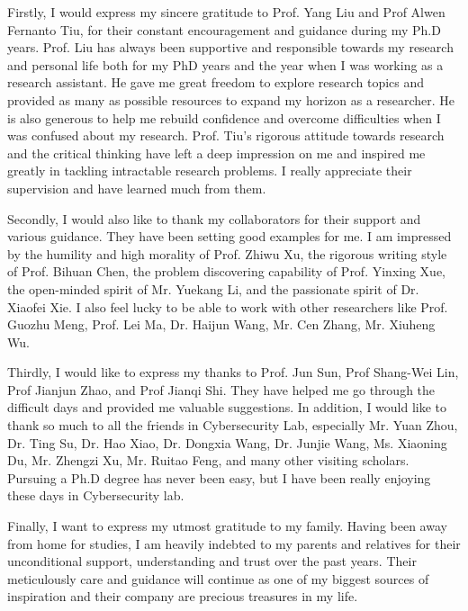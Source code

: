 Firstly, I would express my sincere gratitude to Prof. Yang Liu and Prof Alwen Fernanto Tiu, for their constant encouragement and guidance during my Ph.D years. Prof. Liu has always been supportive and responsible towards my research and personal life both for my PhD years and the year when I was working as a research assistant. He gave me great freedom to explore research topics and provided as many as possible resources to expand my horizon as a researcher. He is also generous to help me rebuild confidence and overcome difficulties when I was confused about my research. Prof. Tiu's rigorous attitude towards research and the critical thinking have left a deep impression on me and inspired me greatly in tackling intractable research problems. I really appreciate their supervision and have learned much from them.

Secondly, I would also like to thank my collaborators for their support and various guidance. They have been setting good examples for me. I am impressed by the humility and high morality of Prof. Zhiwu Xu, the rigorous writing style of Prof. Bihuan Chen, the problem discovering capability of Prof. Yinxing Xue, the open-minded spirit of Mr. Yuekang Li, and the passionate spirit of Dr. Xiaofei Xie. I also feel lucky to be able to work with other researchers like Prof. Guozhu Meng, Prof. Lei Ma, Dr. Haijun Wang, Mr. Cen Zhang, Mr. Xiuheng Wu.

Thirdly, I would like to express my thanks to Prof. Jun Sun, Prof Shang-Wei Lin, Prof Jianjun Zhao, and Prof Jianqi Shi. They have helped me go through the difficult days and provided me valuable suggestions. In addition, I would like to thank so much to all the friends in Cybersecurity Lab, especially Mr. Yuan Zhou, Dr. Ting Su, Dr. Hao Xiao, Dr. Dongxia Wang, Dr. Junjie Wang, Ms. Xiaoning Du, Mr. Zhengzi Xu, Mr. Ruitao Feng, and many other visiting scholars. Pursuing a Ph.D degree has never been easy, but I have been really enjoying these days in Cybersecurity lab.

Finally, I want to express my utmost gratitude to my family. Having been away from home for studies, I am heavily indebted to my parents and relatives for their unconditional support, understanding and trust over the past years. Their meticulously care and guidance will continue as one of my biggest sources of inspiration and their company are precious treasures in my life.
